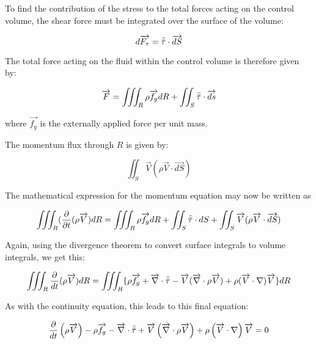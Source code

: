 To find the contribution of the stress to the total forces acting on the
control volume, the shear force must be integrated over the surface of the
volume:

\begin{equation}
  d\overrightarrow{F_\tau} = \bar{\bar{\tau}}\cdot \overrightarrow{dS}
\end{equation}

The total force acting on the fluid within the control volume is therefore given by:

\begin{equation}
  \overrightarrow{F} = \iiint_R\rho\overrightarrow{f_g} dR + \iint_S\bar{\bar{\tau}}\cdot \overrightarrow{ds}
\end{equation}

where $\overrightarrow{f_g}$ is the externally applied force per unit mass.

The momentum flux through $R$ is given by:

\begin{equation}
  \iint_S \overrightarrow{V}\left(\rho\overrightarrow{V}\cdot\overrightarrow{dS}\right)
\end{equation}

The mathematical expression for the momentum equation may now be written as

\begin{equation}
  \iiint_R(\frac{\partial}{\partial{t}}(\rho\overrightarrow{V})dR = \iiint_R\rho\overrightarrow{f_g} dR + 
    \iint_S\bar{\bar{\tau}}\cdot dS + \iint_S \overrightarrow{V}(\rho\overrightarrow{V}\cdot \overrightarrow{dS})
\end{equation}

Again, using the divergence theorem to convert surface integrals to volume integrals, we get this:

\begin{equation}
  \iiint_R\frac{\partial}{dt}(\rho\overrightarrow{V})dR = \iiint_R\{\rho \overrightarrow{f_g} + \overrightarrow{\nabla}\cdot\bar{\bar{\tau}} - \overrightarrow{V}(\overrightarrow{\nabla}\cdot \rho\overrightarrow{V}) + \rho(\overrightarrow{V}\cdot\nabla)\overrightarrow{V}\}dR
\end{equation}

As with the continuity equation, this leads to this final equation:

\begin{equation}
\frac{\partial}{dt}\left(\rho\overrightarrow{V}\right) 
  - \rho \overrightarrow{f_g} 
  - \overrightarrow{\nabla}\cdot\bar{\bar{\tau}} 
  + \overrightarrow{V}\left(\overrightarrow{\nabla}\cdot \rho\overrightarrow{V}\right) 
  + \rho\left(\overrightarrow{V}\cdot\nabla\right)\overrightarrow{V} = 0
\end{equation}

